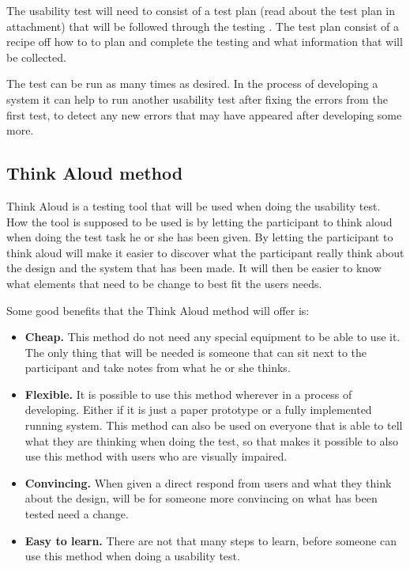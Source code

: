 The usability test will need to consist of a test plan (read about the test plan in attachment) that will be followed through the testing \cite{usability-testing}. The test plan consist of a recipe off how to 
to plan and complete the testing and what information that will be collected\cite{usability-testing}. 

The test can be run as many times as desired. In the process of developing a system it can help to run another usability test after fixing the errors from the first test, to detect any new errors that may have appeared after developing some more.

\subsection{Think Aloud method}
Think Aloud is a testing tool that will be used when doing the usability test. \cite{Think_Aloud}
How the tool is supposed to be used is by letting the participant to think aloud when doing the test task he or she has been given. By letting the participant to think aloud will make it easier to discover what the participant really think about the design and the system that has been made. \cite{Think_Aloud}
It will then be easier to know what elements that need to be change to best fit the users needs. 

Some good benefits that the Think Aloud method will offer is: \cite{Think_Aloud} 
\begin{itemize}
  \item \textbf{Cheap.} This method do not need any special equipment to be able to use it. The only thing that will be needed is someone that can sit next to the participant and take notes from what he or she thinks. 
  \item \textbf{Flexible.} It is possible to use this method wherever in a process of developing. Either if it is just a paper prototype or a fully implemented running system. This method can also be used on everyone that is able to tell what they are thinking when doing the test, so that makes it possible to also use this method with users who are visually impaired.
  \item \textbf{Convincing.} When given a direct respond from users and what they think about the design, will be for someone more convincing on what has been tested need a change.
  \item \textbf{Easy to learn.} There are not that many steps to learn, before someone can use this method when doing a usability test. 
\end{itemize}

